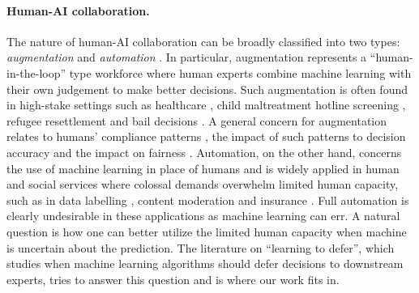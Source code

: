 \paragraph{Human-AI collaboration.} 
The nature of human-AI collaboration can be broadly classified into two types: \emph{augmentation} and \emph{automation} \citep{brynjolfsson2017can, raisch2021artificial}. In particular, augmentation represents a ``human-in-the-loop'' type workforce where human experts combine machine learning with their own judgement to make better decisions. Such augmentation is often found in high-stake settings such as healthcare \citep{lebovitz2022engage}, child maltreatment hotline screening \citep{De-ArteagaFC20}, refugee resettlement \citep{bansak2020outcome,ahani2023dynamic} and bail decisions \citep{kleinberg2018human}. A general concern for augmentation relates to humans' compliance patterns \citep{bastani2021improving,lebovitz2022engage}, the impact of such patterns to decision accuracy \citep{kleinberg2018human,mclaughlin2022algorithmic} and the impact on fairness \citep{McLaughlinSG22,ge2023rethinking}. Automation, on the other hand, concerns the use of machine learning in place of humans and is widely applied in human and social services where colossal demands overwhelm limited human capacity, such as in data labelling \citep{vishwakarma2023promises}, content moderation \citep{gorwa2020algorithmic,makhijani2021quest} and insurance \citep{eubanks2018automating}. Full automation is clearly undesirable in these applications as machine learning can err. A natural question is how one can better utilize the limited human capacity when machine is uncertain about the prediction. The literature on ``learning to defer'', which studies when machine learning algorithms should defer decisions to downstream experts, tries to answer this question and is where our work fits in. 

